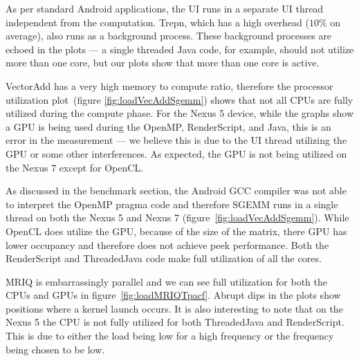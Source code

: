 As per standard Android applications, the UI runs in a separate UI thread 
  independent from the computation.
Trepn, which has a high overhead ($10\%$ on average), also runs as a background
  process.
These background processes are echoed in
  the plots --- a single threaded Java code, for example, should not utilize more than one core, but our plots show that more than one core is active.


VectorAdd has a very high memory to compute ratio, therefore the processor utilization
  plot~(figure \ref{fig:loadVecAddSgemm}) shows that not all CPUs 
  are fully utilized during the compute phase.
For the Nexus 5 device, while the graphs show a GPU is being used during the OpenMP,
  RenderScript, and Java, this is an error in the measurement --- we believe this is 
  due to the UI thread utilizing the GPU or some other interferences.
As expected, the GPU is not being utilized on the Nexus 7 except for OpenCL.

As discussed in the benchmark section, the Android GCC compiler was not able 
  to interpret the OpenMP pragma code and therefore SGEMM runs in a single thread
  on both the Nexus 5 and Nexus 7 (figure~\ref{fig:loadVecAddSgemm}).
While OpenCL does utilize the GPU, because of the size of the matrix, there GPU has
  lower occupancy and therefore does not achieve peek performance.
Both the RenderScript and ThreadedJava code make full utilization of all the cores.

MRIQ is embarrassingly parallel and we can see full utilization for both the CPUs and GPUs in figure~\ref{fig:loadMRIQTpacf}.
Abrupt dips in the plots show positions where a kernel launch occurs.
It is also interesting to note that on the Nexus 5 the CPU is not fully utilized for both ThreadedJava and RenderScript.
This is due to either the load being low for a high frequency or the frequency being 
  chosen to be low.


